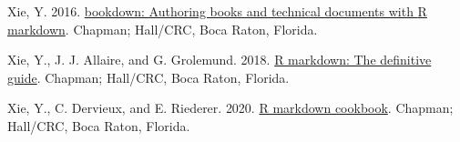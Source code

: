\documentclass[fleqn,10pt,lineno]{wlpeerj} %
\newlength{\cslhangindent}
\newenvironment{CSLReferences}[2] %
 {\begin{list}{}{%
  \setlength{\itemindent}{0pt}
  \setlength{\leftmargin}{0pt}
  \setlength{\parsep}{0pt}
  \ifodd #1
   \setlength{\leftmargin}{\cslhangindent}
   \setlength{\itemindent}{-1\cslhangindent}
  \fi
  \setlength{\itemsep}{#2\baselineskip}}}
 {\end{list}}
\begin{document}
\begin{CSLReferences}{1}{0}
Xie, Y. 2016. \href{https://bookdown.org/yihui/bookdown}{{b}ookdown: Authoring books and technical documents with {R} markdown}. Chapman; Hall/CRC, Boca Raton, Florida.

Xie, Y., J. J. Allaire, and G. Grolemund. 2018. \href{https://bookdown.org/yihui/rmarkdown}{R markdown: The definitive guide}. Chapman; Hall/CRC, Boca Raton, Florida.

Xie, Y., C. Dervieux, and E. Riederer. 2020. \href{https://bookdown.org/yihui/rmarkdown-cookbook}{R markdown cookbook}. Chapman; Hall/CRC, Boca Raton, Florida.

\end{CSLReferences}
\end{document}
